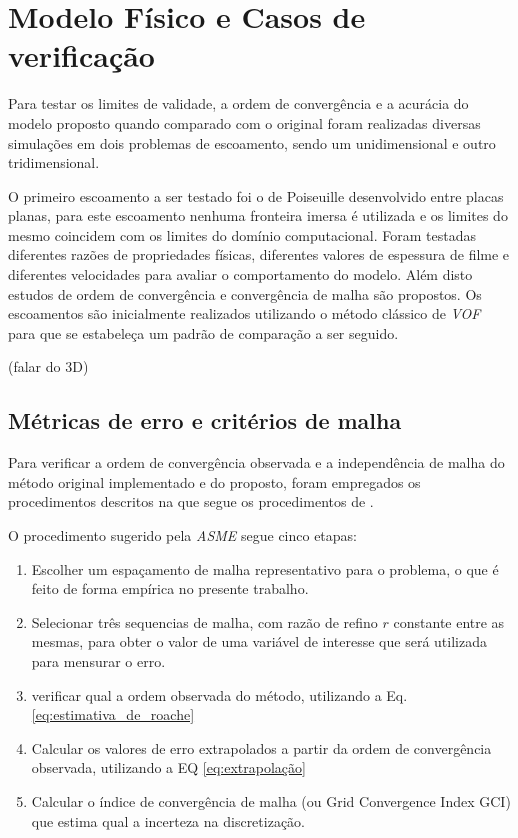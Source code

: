 \chapter{Modelo Físico e Casos de verificação}

Para testar os limites de validade, a ordem de convergência e a acurácia do modelo proposto quando comparado com o original foram realizadas diversas simulações em dois problemas de escoamento, sendo um unidimensional e outro tridimensional.

O primeiro escoamento a ser testado foi o de Poiseuille desenvolvido entre placas planas, para este escoamento nenhuma fronteira imersa é utilizada e os limites do mesmo coincidem com os limites do domínio computacional. Foram testadas diferentes razões de propriedades físicas, diferentes valores de espessura de filme e diferentes velocidades para avaliar o comportamento do modelo. Além disto estudos de ordem de convergência e convergência de malha são propostos. Os escoamentos são inicialmente realizados utilizando o método clássico de \textit{VOF} para que se estabeleça um padrão de comparação a ser seguido. 

(falar do 3D)
\section{Métricas de erro e critérios de malha}

Para verificar a ordem de convergência observada e a independência de malha do método original implementado e do proposto, foram empregados os procedimentos descritos na \cite{Celik2008} que segue os procedimentos de \cite{Roache1994}. 

O procedimento sugerido pela \textit{ASME} segue cinco etapas:

\begin{enumerate}
    \item Escolher um espaçamento de malha representativo para o problema, o que é feito de forma empírica no presente trabalho. 
    \item Selecionar três sequencias de malha, com razão de refino $r$ constante entre as mesmas, para obter o valor de uma variável de interesse que será utilizada para mensurar o erro. 
    \item verificar qual a ordem observada do método, utilizando a Eq. \ref{eq:estimativa_de_roache}
    \item Calcular os valores de erro extrapolados a partir da ordem de convergência observada, utilizando a EQ \ref{eq:extrapolação}
    \item Calcular o índice de convergência de malha (ou Grid Convergence Index GCI) que estima qual a incerteza na discretização.
\end{enumerate}

